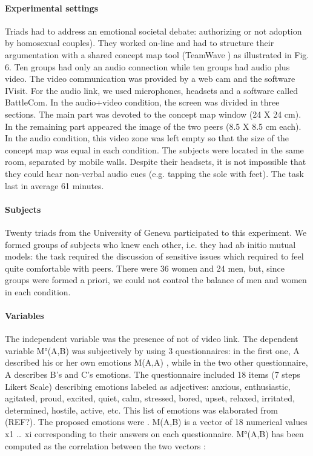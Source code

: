 \documentclass[twocolumn]{article}
\begin{document}
\paragraph{Experimental settings} 

Triads had to address an emotional societal debate: authorizing or not adoption
by homosexual couples). They worked on-line and had to structure their
argumentation with a shared concept map tool (TeamWave) as illustrated in Fig.
6. Ten groups had only an audio connection while ten groups had audio plus
video. The video communication was provided by a web cam and the software
IVisit. For the audio link, we used microphones, headsets and a software called
BattleCom. In the audio+video condition, the screen was divided in three
sections. The main part was devoted to the concept map window (24 X 24 cm). In
the remaining part appeared the image of the two peers (8.5 X 8.5 cm each). In
the audio condition, this video zone was left empty so that the size of the
concept map was equal in each condition. The subjects were located in the same
room, separated by mobile walls. Despite their headsets, it is not impossible
that they could hear non-verbal audio cues (e.g. tapping the sole with feet).
The task last in average 61 minutes.  

\paragraph{Subjects}

Twenty triads from the University of Geneva participated to this experiment. We
formed groups of subjects who knew each other, i.e. they had ab initio mutual
models: the task required the discussion of sensitive issues which required to
feel quite comfortable with peers. There were 36 women and 24 men, but, since
groups were formed a priori, we could not control the balance of men and women
in each condition.

\paragraph{Variables}

The independent variable was the presence of not of video link. The dependent
variable M°(A,B) was subjectively by using 3 questionnaires: in the first one, A
described his or her own emotions M(A,A) , while in the two other questionnaire,
A describes B’s and C’s emotions.   The questionnaire included 18 items (7 steps
Likert Scale) describing emotions labeled as adjectives: anxious, enthusiastic,
agitated, proud, excited, quiet, calm, stressed, bored, upset, relaxed,
irritated, determined, hostile, active, etc. This list of emotions was
elaborated from (REF?). The proposed emotions were . M(A,B) is a vector of 18
numerical values {x1 … xi} corresponding to their answers on each questionnaire.
M°(A,B) has been computed as the correlation between the two vectors :  
\end{document}
